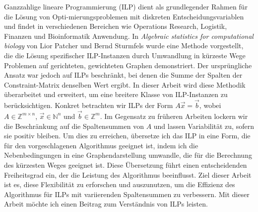 \documentclass{report}
\theoremstyle{definition}
\begin{document}
Ganzzahlige lineare Programmierung (ILP) dient als grundlegender Rahmen für die Lösung von Opti-mierungsproblemen mit diskreten Entscheidungsvariablen und findet in verschiedenen Bereichen wie Operations Research, Logistik, Finanzen und Bioinformatik Anwendung. In \textit{Algebraic statistics for computational biology} von Lior Patcher und Bernd Sturmfels wurde eine Methode vorgestellt, die die Lösung spezifischer ILP-Instanzen durch Umwandlung in kürzeste Wege Problemen auf gerichteten, gewichteten Graphen demonstriert. Der ursprüngliche Ansatz war jedoch auf ILPs beschränkt, bei denen die Summe der Spalten der Constraint-Matrix denselben Wert ergibt. In dieser Arbeit wird diese Methodik überarbeitet und erweitert, um eine breitere Klasse von ILP-Instanzen zu berücksichtigen. Konkret betrachten wir ILPs der Form $A\vec x = \vec b$, wobei $A\in \mathbb{Z}^{m \times n}$, $\vec x \in \mathbb{N}^n$ und $\vec b \in \mathbb{Z}^m$. Im Gegensatz zu früheren Arbeiten lockern wir die Beschränkung auf die Spaltensummen von $A$ und lassen Variabilität zu, sofern sie positiv bleiben. Um dies zu erreichen, übersetze ich das ILP in eine Form, die für den vorgeschlagenen Algorithmus geeignet ist, indem ich die Nebenbedingungen in eine Graphendarstellung umwandle, die für die Berechnung des kürzesten Weges geeignet ist. Diese Übersetzung führt einen entscheidenden Freiheitsgrad ein, der die Leistung des Algorithmus beeinflusst. Ziel dieser Arbeit ist es, diese Flexibilität zu erforschen und auszunutzen, um die Effizienz des Algorithmus für ILPs mit variierenden Spaltensummen zu verbessern. Mit dieser Arbeit möchte ich einen Beitrag zum Verständnis von ILPs leisten.



\tableofcontents





% 

\newpage
\thispagestyle{empty}
\end{document}
